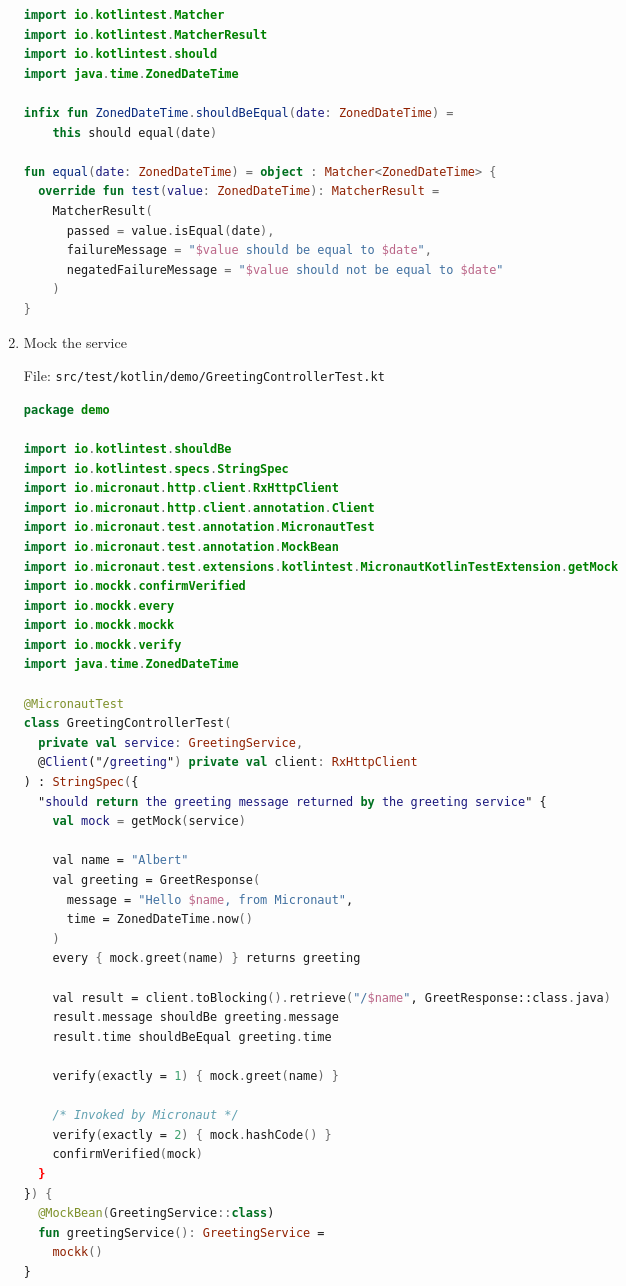 \begin{enumerate}
\begin{lstlisting}[language=Kotlin]
import io.kotlintest.Matcher
import io.kotlintest.MatcherResult
import io.kotlintest.should
import java.time.ZonedDateTime

infix fun ZonedDateTime.shouldBeEqual(date: ZonedDateTime) =
    this should equal(date)

fun equal(date: ZonedDateTime) = object : Matcher<ZonedDateTime> {
  override fun test(value: ZonedDateTime): MatcherResult =
    MatcherResult(
      passed = value.isEqual(date),
      failureMessage = "$value should be equal to $date",
      negatedFailureMessage = "$value should not be equal to $date"
    )
}
\end{lstlisting}


\item Mock the service

File: \texttt{src/test/kotlin/demo/GreetingControllerTest.kt}
\begin{lstlisting}[language=Kotlin]
package demo

import io.kotlintest.shouldBe
import io.kotlintest.specs.StringSpec
import io.micronaut.http.client.RxHttpClient
import io.micronaut.http.client.annotation.Client
import io.micronaut.test.annotation.MicronautTest
import io.micronaut.test.annotation.MockBean
import io.micronaut.test.extensions.kotlintest.MicronautKotlinTestExtension.getMock
import io.mockk.confirmVerified
import io.mockk.every
import io.mockk.mockk
import io.mockk.verify
import java.time.ZonedDateTime

@MicronautTest
class GreetingControllerTest(
  private val service: GreetingService,
  @Client("/greeting") private val client: RxHttpClient
) : StringSpec({
  "should return the greeting message returned by the greeting service" {
    val mock = getMock(service)

    val name = "Albert"
    val greeting = GreetResponse(
      message = "Hello $name, from Micronaut",
      time = ZonedDateTime.now()
    )
    every { mock.greet(name) } returns greeting

    val result = client.toBlocking().retrieve("/$name", GreetResponse::class.java)
    result.message shouldBe greeting.message
    result.time shouldBeEqual greeting.time

    verify(exactly = 1) { mock.greet(name) }

    /* Invoked by Micronaut */
    verify(exactly = 2) { mock.hashCode() }
    confirmVerified(mock)
  }
}) {
  @MockBean(GreetingService::class)
  fun greetingService(): GreetingService =
    mockk()
}
\end{lstlisting}


\end{enumerate}
